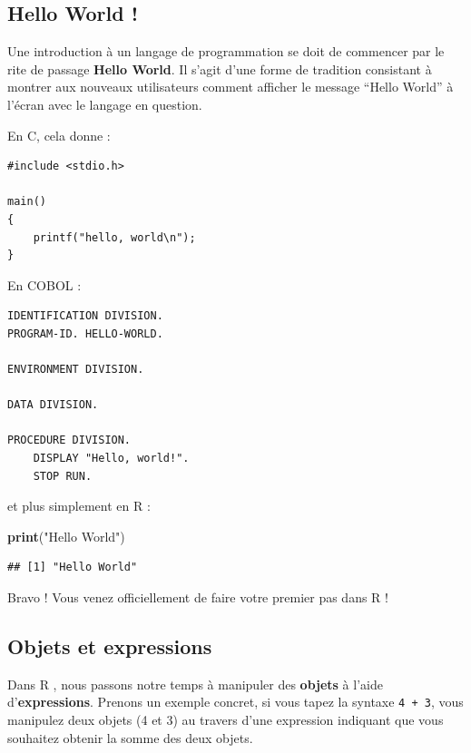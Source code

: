 \documentclass[
  11pt,
  french,
]{book}
\makeatletter
\newenvironment{Shaded}{\begin{snugshade}}{\end{snugshade}}
\newcommand{\KeywordTok}[1]{\textcolor[rgb]{0.13,0.29,0.53}{\textbf{#1}}}
\newcommand{\NormalTok}[1]{#1}
\newcommand{\StringTok}[1]{\textcolor[rgb]{0.31,0.60,0.02}{#1}}
\newenvironment{kframe}{%
\medskip{}
\setlength{\fboxsep}{.8em}
 \def\at@end@of@kframe{}%
 \ifinner\ifhmode%
  \def\at@end@of@kframe{\end{minipage}}%
  \begin{minipage}{\columnwidth}%
 \fi\fi%
 \def\FrameCommand##1{\hskip\@totalleftmargin \hskip-\fboxsep
 \colorbox{shadecolor}{##1}\hskip-\fboxsep
     \hskip-\linewidth \hskip-\@totalleftmargin \hskip\columnwidth}%
 \MakeFramed {\advance\hsize-\width
   \@totalleftmargin\z@ \linewidth\hsize
   \@setminipage}}%
 {\par\unskip\endMakeFramed%
 \at@end@of@kframe}
\renewenvironment{Shaded}{\begin{kframe}}{\end{kframe}}
\makeatother
\begin{document}
\hypertarget{sect0131}{%
\subsection{Hello World !}\label{sect0131}}

Une introduction à un langage de programmation se doit de commencer par le rite de passage \textbf{Hello World}. Il s'agit d'une forme de tradition consistant à montrer aux nouveaux utilisateurs comment afficher le message ``Hello World'' à l'écran avec le langage en question.

En C, cela donne :

\begin{verbatim}
#include <stdio.h>

main()
{
    printf("hello, world\n");
}
\end{verbatim}

En COBOL :

\begin{verbatim}
IDENTIFICATION DIVISION.
PROGRAM-ID. HELLO-WORLD.

ENVIRONMENT DIVISION.

DATA DIVISION.

PROCEDURE DIVISION.
    DISPLAY "Hello, world!".
    STOP RUN.
\end{verbatim}

et plus simplement en R :

\begin{Shaded}
\begin{Highlighting}[]
\KeywordTok{print}\NormalTok{(}\StringTok{"Hello World"}\NormalTok{)}
\end{Highlighting}
\end{Shaded}

\begin{verbatim}
## [1] "Hello World"
\end{verbatim}

Bravo ! Vous venez officiellement de faire votre premier pas dans R !

\hypertarget{sect0132}{%
\subsection{Objets et expressions}\label{sect0132}}

Dans R , nous passons notre temps à manipuler des \textbf{objets} à l'aide d'\textbf{expressions}. Prenons un exemple concret, si vous tapez la syntaxe \texttt{4\ +\ 3}, vous manipulez deux objets (4 et 3) au travers d'une expression indiquant que vous souhaitez obtenir la somme des deux objets.
\end{document}
